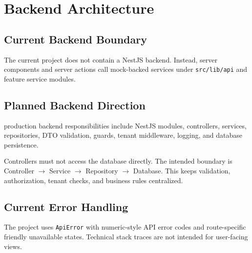 \chapter{Backend Architecture}
\section{Current Backend Boundary}
The current project does not contain a NestJS backend. Instead, server components and server actions call mock-backed services under \texttt{src/lib/api} and feature service modules.

\section{Planned Backend Direction}
\statusplanned{} production backend responsibilities include NestJS modules, controllers, services, repositories, DTO validation, guards, tenant middleware, logging, and database persistence.

\begin{decisionbox}
Controllers must not access the database directly. The intended boundary is Controller $\rightarrow$ Service $\rightarrow$ Repository $\rightarrow$ Database. This keeps validation, authorization, tenant checks, and business rules centralized.
\end{decisionbox}



\section{Current Error Handling}
The project uses \texttt{ApiError} with numeric-style API error codes and route-specific friendly unavailable states. Technical stack traces are not intended for user-facing views.
